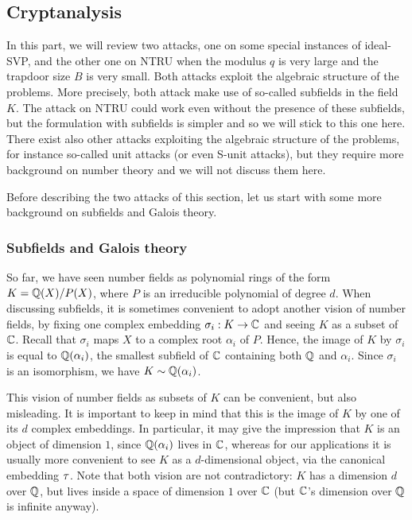 \subsection{Cryptanalysis}
\label{sec:cryptanalysis}

In this part, we will review two attacks, one on some special instances of ideal-SVP, and the other one on NTRU when the modulus $q$ is very large and the trapdoor size $B$ is very small. Both attacks exploit the algebraic structure of the problems. More precisely, both attack make use of so-called subfields in the field $K$. The attack on NTRU could work even without the presence of these subfields, but the formulation with subfields is simpler and so we will stick to this one here.
There exist also other attacks exploiting the algebraic structure of the problems, for instance so-called unit attacks (or even S-unit attacks), but they require more background on number theory and we will not discuss them here.

Before describing the two attacks of this section, let us start with some more background on subfields and Galois theory.

\subsubsection{Subfields and Galois theory}

So far, we have seen number fields as polynomial rings of the form $K = \mathbb{Q}(X)/P(X)$, where $P$ is an irreducible polynomial of degree $d$. When discussing subfields, it is sometimes convenient to adopt another vision of number fields, by fixing one complex embedding $\sigma_i: K \rightarrow \mathbb{C}$ and seeing $K$ as a subset of $\mathbb{C}$. Recall that $\sigma_i$ maps $X$ to a complex root $\alpha_i$ of $P$. Hence, the image of $K$ by $\sigma_i$ is equal to $\mathbb{Q}(\alpha_i)$, the smallest subfield of $\mathbb{C}$ containing both $\mathbb{Q}$ and $\alpha_i$. Since $\sigma_i$ is an isomorphism, we have $K \sim \mathbb{Q}(\alpha_i)$.

This vision of number fields as subsets of $K$ can be convenient, but also misleading. It is important to keep in mind that this is the image of $K$ by one of its $d$ complex embeddings. In particular, it may give the impression that $K$ is an object of dimension $1$, since $\mathbb{Q}(\alpha_i)$ lives in $\mathbb{C}$, whereas for our applications it is usually more convenient to see $K$ as a $d$-dimensional object, via the canonical embedding $\tau$. Note that both vision are not contradictory: $K$ has a dimension $d$ over $\mathbb{Q}$, but lives inside a space of dimension $1$ over $\mathbb{C}$ (but $\mathbb{C}$'s dimension over $\mathbb{Q}$ is infinite anyway).

